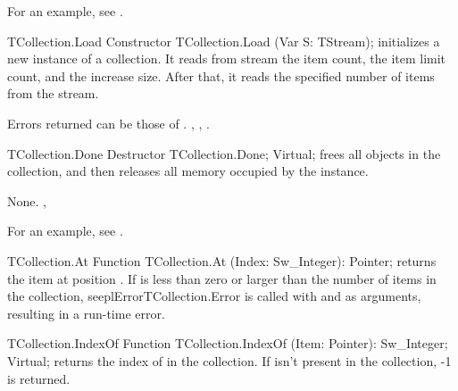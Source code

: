 For an example, see .

\begin{procedure}{TCollection.Load}
\Declaration
Constructor TCollection.Load (Var S: TStream);
\Description
{} initializes a new instance of a collection. It reads from stream
 the item count, the item limit count, and the increase size. After
that, it reads the specified number of items from the stream. 

\Errors
Errors returned can be those of .
\SeeAlso
{}, ,
.
\end{procedure}

\html{}

\begin{procedure}{TCollection.Done}
\Declaration
Destructor TCollection.Done; Virtual;
\Description
{} frees all objects in the collection, and then releases all memory
occupied by the instance.

\Errors
None.
\SeeAlso
{}, 
\end{procedure}

For an example, see .

\begin{function}{TCollection.At}
\Declaration
Function TCollection.At (Index: Sw\_Integer): Pointer;
\Description
{} returns the item at position .
\Errors
If  is less than zero or larger than the number of items
in the collection, seepl{Error}{TCollection.Error} is called with
 and  as arguments, resulting in a run-time
error.
\SeeAlso
{}
\end{function}


\begin{function}{TCollection.IndexOf}
\Declaration
Function TCollection.IndexOf (Item: Pointer): Sw\_Integer; Virtual;
\Description
{} returns the index of  in the collection. 
If  isn't present in the collection, -1 is returned.
\Errors
\SeeAlso
\end{function}

\html{}

